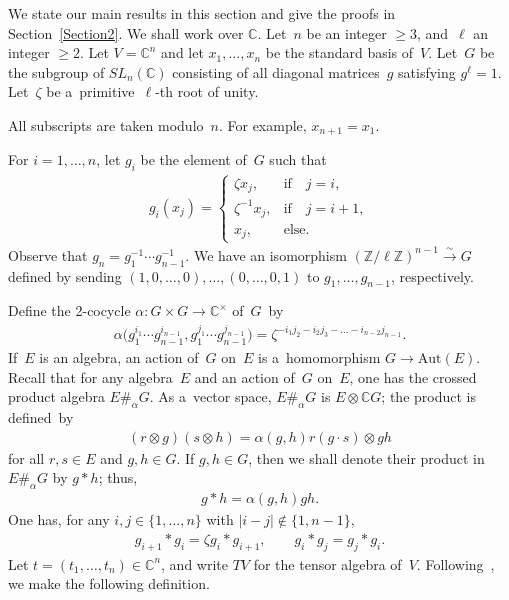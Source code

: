 \documentclass[11pt]{article}
\numberwithin{equation}{section}
\begin{document}
We state our main results in this section and give the proofs in Section~\ref{Section2}.
We shall work over ${\mathbb{C}}$.
Let~$n$ be an integer $\ge 3$, and~$\ell$ an integer $\ge 2$.
Let $V={\mathbb{C}}^n$ and let $x_1,\ldots, x_n$ be the standard basis of~$V$.
Let~$G$ be the subgroup of $SL_n({\mathbb{C}})$ consisting of all diagonal matrices~$g$ satisfying $g^\ell =1$.
Let~$\zeta$ be a~primitive~$\ell$-th root of unity.

\begin{Notation}
All subscripts are taken modulo~$n$.
For example, $x_{n+1}=x_1$.
\end{Notation}

For $i=1,\dots, n$, let $g_i$ be the element of~$G$ such that
\begin{gather*}
g_i (x_j) =
\begin{cases}
\zeta x_j, & \text{if} \quad j=i,
\\
\zeta^{-1} x_j, & \text{if} \quad j=i+1,
\\
x_j, & \mbox {else}.
\end{cases}
\end{gather*}
Observe that $g_n=g_1^{-1}\cdots g_{n-1}^{-1}$.
We have an isomorphism $({\mathbb{Z}}/\ell{\mathbb{Z}})^{n-1} \overset{\sim}{\longrightarrow} G$ def\/ined by sending
$(1,0,\dots,0),\ldots, (0,\ldots, 0,1)$ to $g_1,\dots, g_{n-1}$, respectively.

Def\/ine the 2-cocycle $\alpha: G\times G\to {\mathbb{C}}^\times$ of~$G$~by
\begin{gather*}
\alpha\big(g_1^{i_1} \cdots g_{n-1}^{i_{n-1}}, g_1^{j_1} \cdots g_{n-1}^{j_{n-1}}\big) = \zeta^{-i_1j_2-i_2j_3-\dots -
i_{n-2}j_{n-1}}.
\end{gather*}
If~$E$ is an algebra, an action of~$G$ on~$E$ is a~homomorphism $G\to \mathrm{Aut}(E)$.
Recall that for any algebra~$E$ and an action of~$G$ on~$E$, one has the crossed product algebra $E\#_\alpha G$.
As a~vector space, $E\#_\alpha G$ is $E\otimes{\mathbb{C}} G$; the product is def\/ined~by
\begin{gather*}
(r\otimes g)(s\otimes h) = \alpha (g,h) r (g\cdot s) \otimes gh
\end{gather*}
for all $r,s \in E$ and $g,h\in G$.
If $g, h\in G$, then we shall denote their product in $E\#_\alpha G$ by $g*h$; thus,
\begin{gather*}
g* h = \alpha(g,h) gh.
\end{gather*}
One has, for any $i, j \in \{1,\ldots,n\}$ with $|i-j|\notin\{1, n-1\}$,
\begin{gather*}
g_{i+1}*g_i = \zeta g_i * g_{i+1},
\qquad
g_i *g_j = g_j *g_i.
\end{gather*}
Let $t=(t_1,\dots, t_n)\in {\mathbb{C}}^n$, and write $TV$ for the tensor algebra of~$V$.
Following~\cite[Examp\-le~2.16]{W}, we make the following def\/inition.
\end{document}

